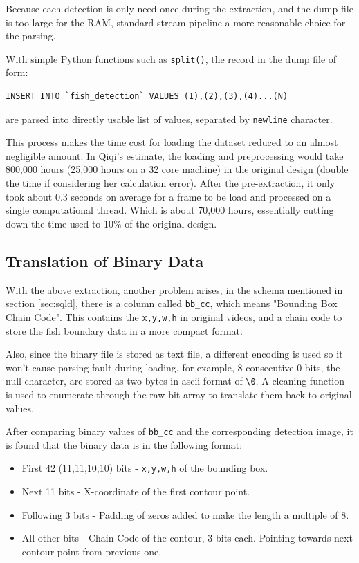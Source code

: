 \documentclass[bsc,logo,twoside,fullspacing,parskip]{infthesis}
\begin{document}
Because each detection is only need once during the extraction, and the dump file is too large for the RAM, standard stream pipeline a more reasonable choice for the parsing. 

With simple Python functions such as {\tt split()}, the record in the dump file of form:
\lstset{basicstyle=\small\ttfamily,breaklines=true,style=sql}
\begin{lstlisting}[frame=single]
 INSERT INTO `fish_detection` VALUES (1),(2),(3),(4)...(N)
\end{lstlisting}
are parsed into directly usable list of values, separated by {\tt newline} character.

This process makes the time cost for loading the dataset reduced to an almost negligible amount. In Qiqi's estimate, the loading and preprocessing would take 800,000 hours (25,000 hours on a 32 core machine) in the original design (double the time if considering her calculation error). After the pre-extraction, it only took about 0.3 seconds on average for a frame to be load and processed on a single computational thread. Which is about 70,000 hours, essentially cutting down the time used to 10\% of the original design.

\subsection{Translation of Binary Data} 

With the above extraction, another problem arises, in the schema mentioned in section \ref{sec:sqld}, there is a column called {\tt bb\_cc}, which means "Bounding Box Chain Code". This contains the {\tt x,y,w,h} in original videos, and a chain code to store the fish boundary data in a more compact format.

Also, since the binary file is stored as text file, a different encoding is used so it won't cause parsing fault during loading, for example, 8 consecutive 0 bits, the null character, are stored as two bytes in ascii format of {\tt \textbackslash0}. A cleaning function is used to enumerate through the raw bit array to translate them back to original values.

After comparing binary values of {\tt bb\_cc} and the corresponding detection image, it is found that the binary data is in the following format:
\begin{itemize}
\item
First 42 (11,11,10,10) bits - {\tt x,y,w,h} of the bounding box.
\item
Next 11 bits - X-coordinate of the first contour point.
\item
Following 3 bits - Padding of zeros added to make the length a multiple of 8.
\item
All other bits - Chain Code of the contour, 3 bits each. Pointing towards next contour point from previous one. 
\end{itemize}
\end{document}
